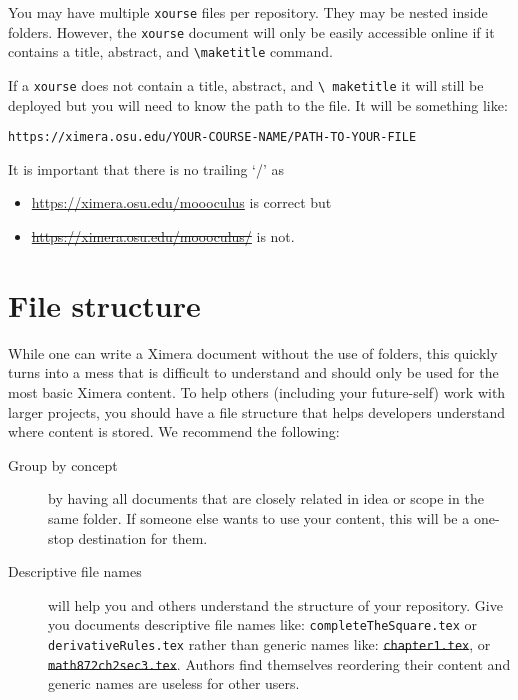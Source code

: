 \documentclass{ximera}
\begin{document}
You may have multiple \verb!xourse! files per repository. They may be nested inside folders. 
  However, the \verb!xourse! document will only be easily accessible online if it
  contains a title,
  abstract, and {\tt\textbackslash maketitle} command.

  If a \verb!xourse! does not contain a title, abstract, and {\tt\textbackslash
      maketitle} it will still be deployed but you will need to know the path
  to the
  file. It will be something like:
  \begin{center}
    \tt https://ximera.osu.edu/YOUR-COURSE-NAME/PATH-TO-YOUR-FILE
  \end{center}
  It is important that there is no trailing `/' as
  \begin{itemize}
    \item \url{https://ximera.osu.edu/moooculus} is correct but
    \item \sout{\url{https://ximera.osu.edu/moooculus/}} is not.
  \end{itemize}








\section{File structure}

While one can write a Ximera document without the use of folders, this quickly
turns into a mess that is difficult to understand and should only be used for
the most basic Ximera content.
To help others (including your future-self) work with larger projects, you
should have a file structure
that helps developers understand where content is stored. We recommend the
following:
\begin{description}
  \item[Group by concept] by having all documents that are closely related in
    idea
    or scope in the same folder. If someone else wants to use your content,
    this will be a one-stop destination for them.
  \item[Descriptive file names] will help you and others understand the
    structure of your repository. Give you documents descriptive file names
    like:
    \verb!completeTheSquare.tex! or \verb!derivativeRules.tex! rather than
    generic
    names like: \sout{\texttt{chapter1.tex}}, or
    \sout{\texttt{math872ch2sec3.tex}}. Authors find themselves reordering
    their content and generic names are useless for other users.
\end{description}
\end{document}
